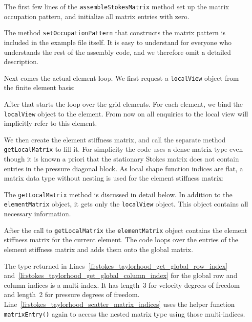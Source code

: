 \documentclass[a4paper,10pt,headings=normal,bibliography=totoc]{scrartcl}
\newcommand{\cpp}[1]{\lstinline[basicstyle=\ttfamily]!#1!}
\begin{document}
The first few lines of the \cpp{assembleStokesMatrix} method set up the matrix occupation pattern,
and initialize all matrix entries with zero.
%

%
The method \cpp{setOccupationPattern} that constructs the matrix pattern is included
in the example file itself.  It is easy to understand for everyone who understands
the rest of the assembly code, and we therefore omit a detailed description.

Next comes the actual element loop.  We first request a \cpp{localView} object
from the finite element basis:
%

%
After that starts the loop over the grid elements.  For each element, we bind the \cpp{localView} object
to the element.
From now on all enquiries to the local view will implicitly refer to this element.
%

%
We then create the element stiffness matrix, and call the separate method \cpp{getLocalMatrix} to fill it.
For simplicity the code uses a dense matrix type even though it is known a priori
that the stationary Stokes matrix does not contain entries in the pressure diagonal block.
As local shape function indices are flat, a matrix data type without nesting is used
for the element stiffness matrix:
%

%
The \cpp{getLocalMatrix} method is discussed in detail below.
In addition to the \cpp{elementMatrix} object, it gets only the \cpp{localView} object.  This object contains
all necessary information.

After the call to \cpp{getLocalMatrix} the \cpp{elementMatrix} object contains the
element stiffness matrix for the current element.
The code loops over the entries of the element stiffness matrix and adds them onto the global matrix.
%

%
The type returned in Lines~\ref{li:stokes_taylorhood_get_global_row_index} and~\ref{li:stokes_taylorhood_get_global_column_index}
for the global row and column indices is a multi-index.  It has length~3 for velocity degrees of freedom and
length~2 for pressure degrees of freedom.
Line~\ref{li:stokes_taylorhood_scatter_matrix_indices} uses the helper function
\cpp{matrixEntry()} again to access the nested matrix type using those multi-indices.
\end{document}
